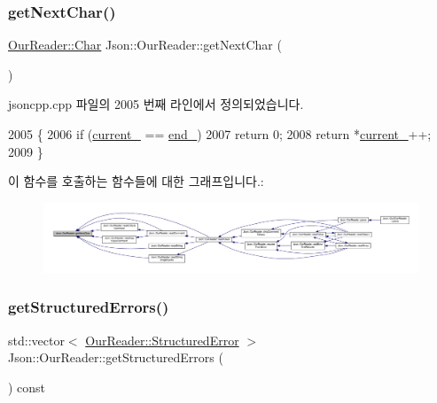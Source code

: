 \subsubsection{\texorpdfstring{get\+Next\+Char()}{getNextChar()}}
{\footnotesize\ttfamily \hyperlink{class_json_1_1_our_reader_a0cd0bab4caa66594ab843ccd5f9dc239}{Our\+Reader\+::\+Char} Json\+::\+Our\+Reader\+::get\+Next\+Char (\begin{DoxyParamCaption}{ }\end{DoxyParamCaption})\hspace{0.3cm}{\ttfamily [private]}}



jsoncpp.\+cpp 파일의 2005 번째 라인에서 정의되었습니다.


\begin{DoxyCode}
2005                                      \{
2006   \textcolor{keywordflow}{if} (\hyperlink{class_json_1_1_our_reader_a5211fbbba94be80a22dd2317c621efcc}{current\_} == \hyperlink{class_json_1_1_our_reader_ab1f69b0260c27a0d2d65dc56e42c8f9d}{end\_})
2007     \textcolor{keywordflow}{return} 0;
2008   \textcolor{keywordflow}{return} *\hyperlink{class_json_1_1_our_reader_a5211fbbba94be80a22dd2317c621efcc}{current\_}++;
2009 \}
\end{DoxyCode}
이 함수를 호출하는 함수들에 대한 그래프입니다.\+:\nopagebreak
\begin{figure}[H]
\begin{center}
\leavevmode
\includegraphics[width=350pt]{class_json_1_1_our_reader_a298285d035fdbc554caae09d9f0a5859_icgraph}
\end{center}
\end{figure}
\mbox{\label{class_json_1_1_our_reader_a0eb2420a6bef89a3f3256191e6e3de6d}} 
\subsubsection{\texorpdfstring{get\+Structured\+Errors()}{getStructuredErrors()}}
{\footnotesize\ttfamily std\+::vector$<$ \hyperlink{struct_json_1_1_our_reader_1_1_structured_error}{Our\+Reader\+::\+Structured\+Error} $>$ Json\+::\+Our\+Reader\+::get\+Structured\+Errors (\begin{DoxyParamCaption}{ }\end{DoxyParamCaption}) const}



